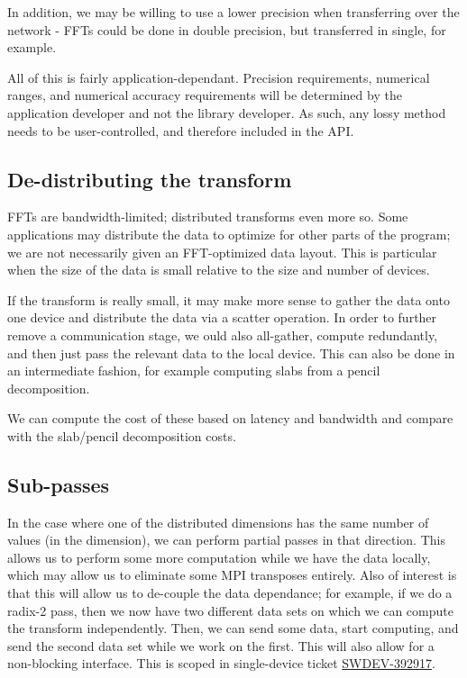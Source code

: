 \documentclass[12pt]{article}
\renewcommand{\(}{\left(}
\renewcommand{\)}{\right)}
\begin{document}
In addition, we may be willing to use a lower precision when
transferring over the network - FFTs could be done in double
precision, but transferred in single, for example.

All of this is fairly application-dependant.  Precision requirements,
numerical ranges, and numerical accuracy requirements will be
determined by the application developer and not the library developer.
As such, any lossy method needs to be user-controlled, and therefore
included in the API.

\subsection{De-distributing the transform}

FFTs are bandwidth-limited; distributed transforms even more so.  Some
applications may distribute the data to optimize for other parts of
the program; we are not necessarily given an FFT-optimized data
layout.  This is particular when the size of the data is small
relative to the size and number of devices.

If the transform is really small, it may make more sense to gather the
data onto one device and distribute the data via a scatter operation.
In order to further remove a communication stage, we ould also
all-gather, compute redundantly, and then just pass the relevant data
to the local device.  This can also be done in an intermediate
fashion, for example computing slabs from a pencil decomposition.

We can compute the cost of these based on latency and bandwidth and
compare with the slab/pencil decomposition costs.

\subsection{Sub-passes}
\label{subpasses}

In the case where one of the distributed dimensions has the same
number of values (in the dimension), we can perform partial passes in
that direction.  This allows us to perform some more computation while
we have the data locally, which may allow us to eliminate some MPI
transposes entirely.  Also of interest is that this will allow us to
de-couple the data dependance; for example, if we do a radix-2 pass,
then we now have two different data sets on which we can compute the
transform independently.  Then, we can send some data, start
computing, and send the second data set while we work on the first.
This will also allow for a non-blocking interface.  This is scoped in
single-device ticket
\href{https://ontrack-internal.amd.com/browse/SWDEV-392917}{SWDEV-392917}.
\end{document}
